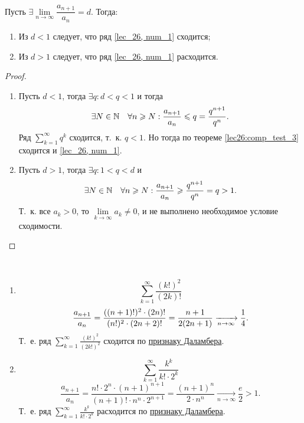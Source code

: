 \documentclass[../../main.tex]{subfiles}
\begin{document}
	\begin{thm}\label{lec27:dalamber}
		
		Пусть $\exists \lim\limits_{n \to \infty} \dfrac{a_{n+1}}{a_n} = d$. Тогда:
		\begin{enumerate}[label={\alph*)}]
		\item Из $d < 1$ следует, что ряд \eqref{lec_26, num_1} сходится;
		\item Из $d > 1$ следует, что ряд \eqref{lec_26, num_1} расходится.
		\end{enumerate}
	\end{thm}
		\begin{proof}
			
			~
			
			\begin{enumerate}[label={\alph*)}]
			\item Пусть $d < 1$, тогда $\exists q : d < q < 1$  и тогда \[\exists N \in 
			\mathbb{N} \quad
			\forall n \geqslant N:
			\frac{a_{n+1}}{a_n} \leqslant q = \frac{q^{n+1}}{q^n}.  \]
			Ряд $\sum\limits_{k=1}^{\infty} q^k$ сходится, т.~к. 
			$q<1$. Но тогда по теореме \ref{lec26:comp_test_3} сходится и 
			\eqref{lec_26, num_1}.
			\item Пусть $d > 1$, тогда $\exists q : 1 < q < d $ и \[\exists N \in \mathbb{N} 
			\quad \forall n 
			\geqslant N:
			\frac{a_{n+1}}{a_n} \geqslant \frac{q^{n+1}}{q^n} = q > 1.  \]
			Т.~к. все $a_k > 0$, то $\lim\limits_{k \to \infty} a_k \neq 0$, и не 
			выполнено необходимое условие сходимости.
			\qedhere
			\end{enumerate}
		\end{proof}
	\begin{examples}

	~

	\begin{enumerate}
	 \item
		\[ \sum_{k = 1}^{\infty} \frac{(k!)^2}{(2k)!}    \]
		\[ \frac{a_{n+1}}{a_n} = \frac{((n+1)!)^2 \cdot (2n)!}{(n!)^2 \cdot (2n+2)!} 
		= 
		\frac{n+1}{2(2n+1)}  \xrightarrow[n \rightarrow \infty]{} \frac{1}{4}. \]
		Т.~е. ряд $\sum\limits_{k = 1}^{\infty} \frac{(k!)^2}{(2k!)^2}$ сходится по 
		\hyperref[lec27:dalamber]{признаку Даламбера}.
	\item
		\[  \sum_{k = 1}^{\infty} \frac{k^k}{k! \cdot 2^k} \]
		\[ \frac{a_{n+1}}{a_n} = \frac{n! \cdot 2^n \cdot (n+1)^{n+1}}{(n+1)! \cdot 
		n^n \cdot 
		2^{n+1}} = \frac{(n+1)^{n}}{2\cdot n^n } \underset{n \rightarrow \infty} 
		{\longrightarrow}  \frac{e}{2} > 1. \]
		Т.~е. ряд $\sum\limits_{k = 1}^{\infty} \frac{k^k}{k! \cdot 2^k}$ расходится 
		по 
		\hyperref[lec27:dalamber]{признаку Даламбера}.
	\end{enumerate}
	\end{examples}
\end{document}
